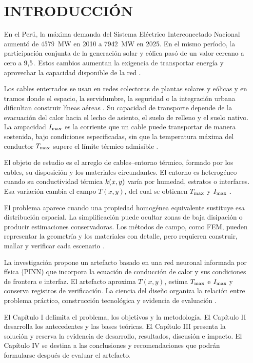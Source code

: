 \chapter*{INTRODUCCIÓN}

En el Perú, la máxima demanda del Sistema Eléctrico Interconectado Nacional aumentó de \SI{4579}{\mega\watt} en 2010 a \SI{7942}{\mega\watt} en 2025. En el mismo período, la participación conjunta de la generación solar y eólica pasó de un valor cercano a cero a 9,5\,\pct{}. Estos cambios aumentan la exigencia de transportar energía y aprovechar la capacidad disponible de la red \parencites{minem2025anuario2024}{minem2025indicadoresDiciembre}{coesMaximaDemanda}{iea2025transmissiongrid}.

Los cables enterrados se usan en redes colectoras de plantas solares y eólicas y en tramos donde el espacio, la servidumbre, la seguridad o la integración urbana dificultan construir líneas aéreas \parencite{cigre2023overheadLines}. Su capacidad de transporte depende de la evacuación del calor hacia el lecho de asiento, el suelo de relleno y el suelo nativo. La ampacidad $I_{\max}$ es la corriente que un cable puede transportar de manera sostenida, bajo condiciones especificadas, sin que la temperatura máxima del conductor $T_{\max}$ supere el límite térmico admisible \parencites[cláusulas~4--5]{iec60287}[3--5]{enescu2020}.

El objeto de estudio es el arreglo de cables--entorno térmico, formado por los cables, su disposición y los materiales circundantes. El entorno es heterogéneo cuando su conductividad térmica $k(x,y)$ varía por humedad, estratos o interfaces. Esa variación cambia el campo $T(x,y)$, del cual se obtienen $T_{\max}$ y $I_{\max}$ \parencites[3--4]{enescu2021}[1,6--7]{khumalo2025}[3]{xing2023}.

El problema aparece cuando una propiedad homogénea equivalente sustituye esa distribución espacial. La simplificación puede ocultar zonas de baja disipación o producir estimaciones conservadoras. Los métodos de campo, como FEM, pueden representar la geometría y los materiales con detalle, pero requieren construir, mallar y verificar cada escenario \parencites[41--42,93--99]{cigre2025}[1--3,12]{aldulaimi2024}.

La investigación propone un artefacto basado en una red neuronal informada por física (PINN) que incorpora la ecuación de conducción de calor y sus condiciones de frontera e interfaz. El artefacto aproxima $T(x,y)$, estima $T_{\max}$ e $I_{\max}$ y conserva registros de verificación. La ciencia del diseño organiza la relación entre problema práctico, construcción tecnológica y evidencia de evaluación \parencites[54--56]{peffers2007}[342--350]{gregor2013}.

El Capítulo I delimita el problema, los objetivos y la metodología. El Capítulo II desarrolla los antecedentes y las bases teóricas. El Capítulo III presenta la solución y reserva la evidencia de desarrollo, resultados, discusión e impacto. El Capítulo IV se destina a las conclusiones y recomendaciones que podrán formularse después de evaluar el artefacto.

